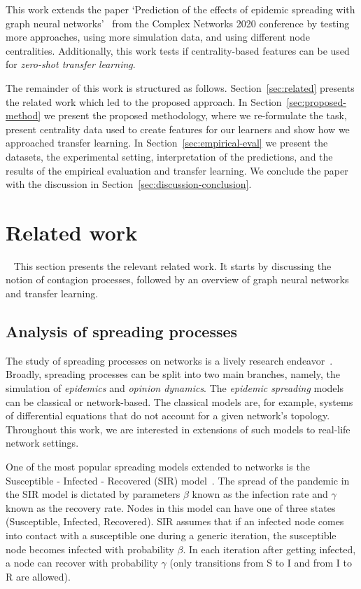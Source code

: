 \documentclass{article}
\begin{document}
This work extends the paper `Prediction of the effects of epidemic spreading with graph neural networks'~\cite{meznar2020spreading} from the Complex Networks 2020 conference by testing more approaches, using more simulation data, and using different node centralities. Additionally, this work tests if centrality-based features can be used for \emph{zero-shot transfer learning}. 

The remainder of this work is structured as follows. Section~\ref{sec:related} presents the related work which led to the proposed approach. In Section~\ref{sec:proposed-method} we present the proposed methodology, where we re-formulate the task, present centrality data used to create features for our learners and show how we approached transfer learning. In Section~\ref{sec:empirical-eval} we present the datasets, the experimental setting, interpretation of the predictions, and the results of the empirical evaluation and transfer learning. We conclude the paper with the discussion in Section~\ref{sec:discussion-conclusion}.

\section{Related work}~\label{sec:related}
This section presents the relevant related work. It starts by discussing the notion of contagion processes, followed by an overview of graph neural networks and transfer learning.

\subsection{Analysis of spreading processes}
The study of spreading processes on networks is a lively research endeavor~\cite{nowzari2016analysis}. Broadly, spreading processes can be split into two main branches, namely, the simulation of \emph{epidemics} and \emph{opinion dynamics}. The \emph{epidemic spreading} models can be classical or network-based. The classical models are, for example, systems of differential equations that do not account for a given network's topology. Throughout this work, we are interested in extensions of such models to real-life network settings.

One of the most popular spreading models extended to networks is the Susceptible - Infected - Recovered (SIR) model~\cite{Kermack1927Epidemics}. The spread of the pandemic in the SIR model is dictated by parameters $\beta$ known as the infection rate and $\gamma$ known as the recovery rate. Nodes in this model can have one of three states (Susceptible, Infected, Recovered). 
SIR assumes that if an infected node comes into contact with a susceptible one during a generic iteration, the susceptible node becomes infected with probability $\beta$. In each iteration after getting infected, a node can recover with probability $\gamma$ (only transitions from S to I and from I to R are allowed). 
\end{document}

